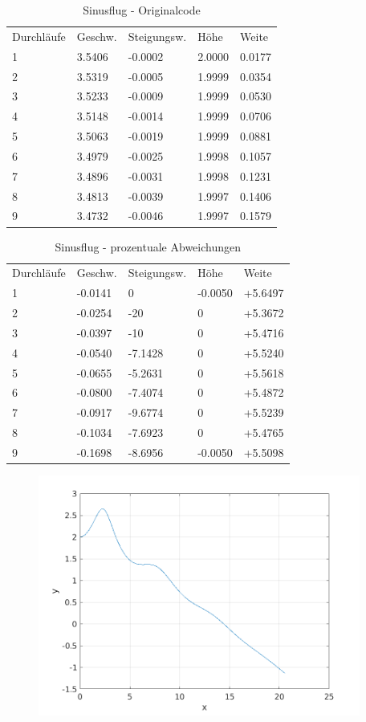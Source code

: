 \documentclass[a4paper,12pt]{scrartcl}
\begin{document}
\begin{table}
\centering
\caption{Sinusflug - Originalcode}
\begin{tabular}{lllll}
Durchläufe & Geschw. & Steigungsw. & Höhe   & Weite   \\
1          & 3.5406  & -0.0002     & 2.0000 & 0.0177  \\
2          & 3.5319  & -0.0005     & 1.9999 & 0.0354  \\
3          & 3.5233  & -0.0009     & 1.9999 & 0.0530  \\
4          & 3.5148  & -0.0014     & 1.9999 & 0.0706  \\
5          & 3.5063  & -0.0019     & 1.9999 & 0.0881  \\
6          & 3.4979  & -0.0025     & 1.9998 & 0.1057  \\
7          & 3.4896  & -0.0031     & 1.9998 & 0.1231  \\
8          & 3.4813  & -0.0039     & 1.9997 & 0.1406  \\
9          & 3.4732  & -0.0046     & 1.9997 & 0.1579 
\end{tabular}
\end{table}
\begin{table}
\centering
\caption{Sinusflug - prozentuale Abweichungen}
\begin{tabular}{lllll}
Durchläufe & Geschw. & Steigungsw. & Höhe   & Weite   \\
1          & -0.0141  &  0    & -0.0050 & +5.6497   \\
2          & -0.0254  &  -20    & 0 & +5.3672  \\
3          & -0.0397  &  -10    & 0 &  +5.4716 \\
4          & -0.0540  &   -7.1428   & 0 & +5.5240  \\
5          & -0.0655  &   -5.2631   & 0 &  +5.5618 \\
6          & -0.0800  &   -7.4074   &  0&   +5.4872\\
7          & -0.0917  &   -9.6774   &  0&   +5.5239\\
8          & -0.1034  &   -7.6923   &  0&   +5.4765\\
9          & -0.1698  &   -8.6956   & -0.0050 &  +5.5098
\end{tabular}
\end{table}
\begin{figure}[htp]
	\centering
	\includegraphics[width=300pt]{flightpath3.png}
	\label{fig:sin2}
\end{figure}
\end{document}
